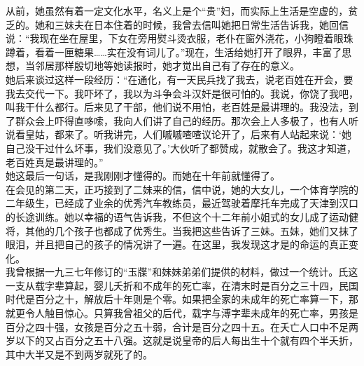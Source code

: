 从前，她虽然有着一定文化水平，名义上是个“贵”妇，而实际上生活是空虚的，贫乏的。她和三妹夫在日本住着的时候，我曾去信叫她把日常生活告诉我，她回信说：“我现在坐在屋里，下女在旁用熨斗烫衣服，老仆在窗外浇花，小狗瞪着眼珠蹲着，看着一匣糖果……实在没有词儿了。”现在，生活给她打开了眼界，丰富了思想，当邻居那样殷切地等她读报时，她才觉出自己有了存在的意义。\\

她后来谈过这样一段经历：“在通化，有一天民兵找了我去，说老百姓在开会，要我去交代一下。我吓坏了，我以为斗争会斗汉奸是很可怕的。我说，你饶了我吧，叫我干什么都行。后来见了干部，他们说不用怕，老百姓是最讲理的。我没法，到了群众会上吓得直哆嗦，我向人们讲了自己的经历。那次会上人多极了，也有人听说看皇姑，都来了。听我讲完，人们嘁嘁喳喳议论开了，后来有人站起来说：‘她自己没干过什么坏事，我们没意见了。’大伙听了都赞成，就散会了。我这才知道，老百姓真是最讲理的。”\\

她这最后一句话，是我刚刚才懂得的。而她在十年前就懂得了。\\

在会见的第二天，正巧接到了二妹来的信，信中说，她的大女儿，一个体育学院的二年级生，已经成了业余的优秀汽车教练员，最近驾驶着摩托车完成了天津到汉口的长途训练。她以幸福的语气告诉我，不但这个十二年前小姐式的女儿成了运动健将，其他的几个孩子也都成了优秀生。当我把这些告诉了三妹。五妹，她们又抹了眼泪，并且把自己的孩子的情况讲了一遍。在这里，我发现这才是的命运的真正变化。\\

我曾根据一九三七年修订的“玉牒”和妹妹弟弟们提供的材料，做过一个统计。氏这一支从载字辈算起，婴儿夭折和不成年的死亡率，在清末时是百分之三十四，民国时代是百分之十，解放后十年则是个零。如果把全家的未成年的死亡率算一下，那就更令人触目惊心。只算我曾祖父的后代，载字与溥字辈未成年的死亡率，男孩是百分之四十强，女孩是百分之五十弱，合计是百分之四十五。在夭亡人口中不足两岁以下的又占百分之五十八强。这就是说皇帝的后人每出生十个就有四个半夭折，其中大半又是不到两岁就死了的。\\


